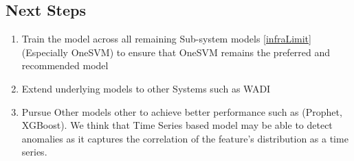 \documentclass{article}
\begin{document}
\subsection{Next Steps}
\begin{enumerate}
    \item Train the model across all remaining Sub-system models \ref{infraLimit} (Especially OneSVM) to ensure that OneSVM remains the preferred and recommended model
    \item Extend underlying models to other Systems such as WADI
    \item Pursue Other models other to achieve better performance such as (Prophet, XGBoost). We think that Time Series based model may be able to detect anomalies as it captures the correlation of the feature's distribution as a time series.
\end{enumerate}
\end{document}

